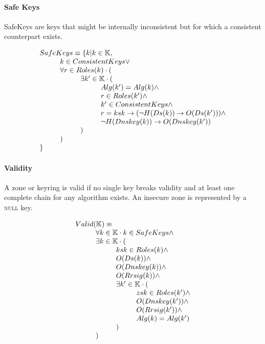 \documentclass[twoside,english, a4paper]{article}
\begin{document}
\paragraph{Safe Keys}
SafeKeys are keys that might be internally inconsistent but for which
a consistent counterpart exists.

\begin{equation}
\begin{array}{l}
SafeKeys \equiv \{ k | k\in\mathbb{K}, \\
\hskip 1cm 		k \in ConsistentKeys \vee \\
\hskip 1cm 		\forall r \in Roles(k) \cdot ( \\
\hskip 2cm 			\exists k' \in \mathbb{K} \cdot ( \\
\hskip 3cm 				Alg(k') = Alg(k) \wedge \\
\hskip 3cm 				r \in Roles(k') \wedge \\
\hskip 3cm 				k' \in ConsistentKeys \wedge \\
\hskip 3cm 				r = ksk \rightarrow (\neg H(Ds(k)) \rightarrow O(Ds(k'))) \wedge \\
\hskip 3cm 				\neg H(Dnskey(k)) \rightarrow O(Dnskey(k')) \\
\hskip 2cm 			)\\
\hskip 1cm 		)\\
\}
\end{array}
\end{equation}

\paragraph{Validity} A zone or keyring is valid if no single key 
breaks validity and at least one complete chain for any algorithm 
exists. An insecure zone is represented by a \textsc{null} key.

\begin{equation}
\begin{array}{l}
Valid(\mathbb{K}) \equiv \\
\hskip 1cm	\forall k \in \mathbb{K} \cdot k \in SafeKeys \wedge \\
\hskip 1cm	\exists k \in \mathbb{K} \cdot ( \\
\hskip 2cm		ksk \in Roles(k) \wedge \\
\hskip 2cm		O(Ds(k)) \wedge \\
\hskip 2cm		O(Dnskey(k)) \wedge \\
\hskip 2cm		O(Rrsig(k)) \wedge \\
\hskip 2cm		\exists k' \in \mathbb{K} \cdot ( \\
\hskip 3cm			zsk \in Roles(k') \wedge \\
\hskip 3cm			O(Dnskey(k')) \wedge \\
\hskip 3cm			O(Rrsig(k')) \wedge \\
\hskip 3cm			Alg(k)=Alg(k')\\
\hskip 2cm		)\\
\hskip 1cm	)
\end{array}
\end{equation}
\end{document}
